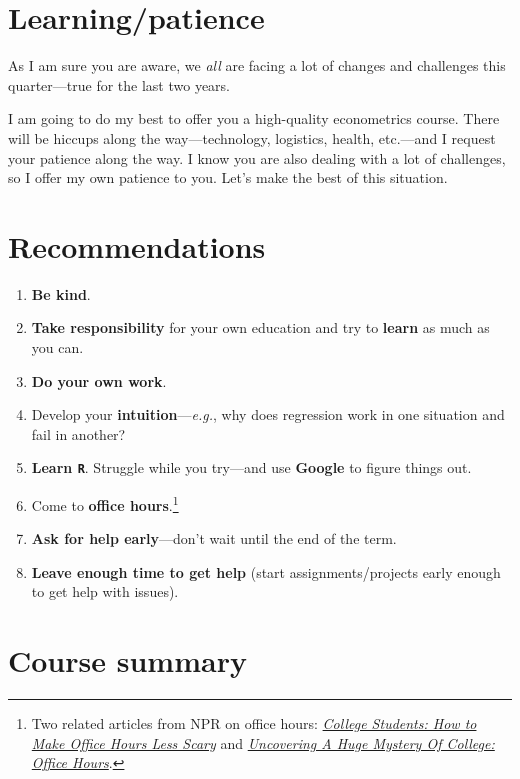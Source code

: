 \documentclass[10pt]{article}
\begin{document}
\section*{Learning/patience}

As I am sure you are aware, we \textit{all} are facing a lot of changes and challenges this quarter---true for the last two years.

I am going to do my best to offer you a high-quality econometrics course. There will be hiccups along the way---technology, logistics, health, etc.---and I request your patience along the way. I know you are also dealing with a lot of challenges, so I offer my own patience to you. Let's make the best of this situation. 

\section*{Recommendations}

\begin{enumerate}
  \item \textbf{Be kind}.
  \item \textbf{Take responsibility} for your own education and try to \textbf{learn} as much as you can.
  \item \textbf{Do your own work}.
  \item Develop your \textbf{intuition}---\textit{e.g.}, why does regression work in one situation and fail in another?
  \item \textbf{Learn \texttt{R}}. Struggle while you try---and use \textbf{Google} to figure things out.
  \item Come to \textbf{office hours}.\footnote{Two related articles from NPR on office hours: \href{https://www.npr.org/2019/10/05/678815966/college-students-how-to-make-office-hours-less-scary}{\textit{College Students: How to Make Office Hours Less Scary}} and \href{https://www.npr.org/2019/10/02/766568824/uncovering-a-huge-mystery-of-college-office-hours}{\textit{Uncovering A Huge Mystery Of College: Office Hours}}.}
  \item \textbf{Ask for help early}---don't wait until the end of the term.
  \item \textbf{Leave enough time to get help} (start assignments/projects early enough to get help with issues).
\end{enumerate}

\section*{Course summary}
\end{document}
